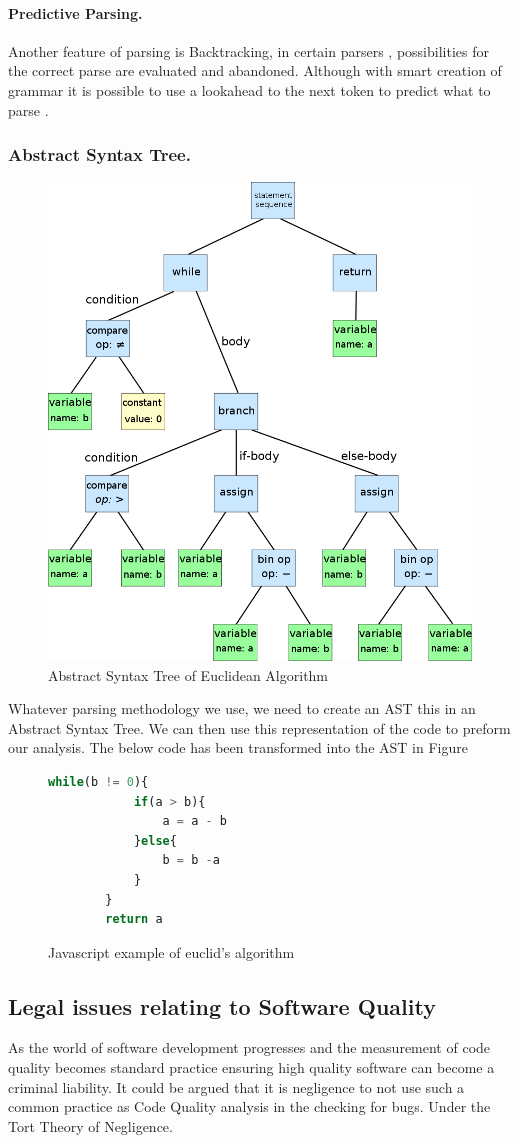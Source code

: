 \paragraph{Predictive Parsing.} Another feature of parsing is Backtracking, in certain parsers , possibilities for the correct parse are evaluated and abandoned. Although with 
smart creation of grammar it is possible to use a lookahead to the next token to predict what to parse \cite{practicalCompiler}.


\subsubsection{Abstract Syntax Tree.}
\begin{figure}[h]
    \includegraphics[width=.2\textwidth]{images/abstract-syntax-tree.png}
    \caption{Abstract Syntax Tree of Euclidean Algorithm \cite{astwiki}}
    \label{fig:abs}
\end{figure}
Whatever parsing methodology we use, we need to create an AST this in an Abstract Syntax Tree. We can then use this representation of the code to preform our analysis.
The below code has been transformed into the AST in Figure 
\begin{figure}[h]
    \begin{lstlisting}[language=Javascript]
        while(b != 0){
            if(a > b){
                a = a - b
            }else{
                b = b -a 
            }
        }
        return a
        \end{lstlisting}
    \caption{Javascript example of euclid's algorithm}
    \label{fig:euclid}
\end{figure}

\subsection{Legal issues relating to Software Quality}
As the world of software development progresses and the measurement of code quality becomes standard practice 
ensuring high quality software can become a criminal liability. It could be argued that it is negligence to not use 
such a common practice as Code Quality analysis in the checking for bugs. Under the Tort Theory of Negligence. \cite{legalLiability}

